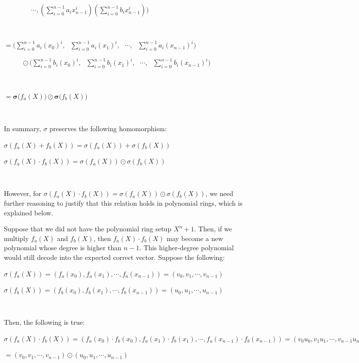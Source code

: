 $  \text{ } \text{ } \text{ } \text{ } \text{ } \text{ }
\cdots,
\left(\sum\limits_{i=0}^{n-1}a_ix_{n-1}^i\right)\left( \sum\limits_{i=0}^{n-1}b_ix_{n-1}^i\right)
\Bigg)$

$ $

$ = \Bigg(\sum\limits_{i=0}^{n-1}a_i(x_0)^i, \text{ } \sum\limits_{i=0}^{n-1}a_i(x_1)^i, \text{ } \cdots, \text{ } \sum\limits_{i=0}^{n-1}a_i(x_{n-1})^i\Bigg)$

$  \text{ } \text{ } \text{ } \text{ }  \odot  \Bigg(\sum\limits_{i=0}^{n-1}b_i(x_0)^i, \text{ } 
\sum\limits_{i=0}^{n-1}b_i(x_1)^i, \text{ }
\cdots, \text{ } \sum\limits_{i=0}^{n-1}b_i(x_{n-1})^i\Bigg)$

$ $

$= \bm{\sigma(}f_a(X)\bm{)} \odot \bm{\sigma(}f_b(X)\bm{)}$

$ $

In summary, $\sigma$ preserves the following homomorphism:

$\sigma(f_a(X) + f_b(X)) = \sigma(f_a(X)) + \sigma(f_b(X))$

$\sigma(f_a(X) \cdot f_b(X)) = \sigma(f_a(X)) \odot \sigma(f_b(X))$

$ $

However, for $\sigma(f_a(X) \cdot f_b(X)) = \sigma(f_a(X)) \odot \sigma(f_b(X))$, we need further reasoning to justify that this relation holds in polynomial rings, which is explained below.


 Suppose that we did not have the polynomial ring setup $X^n + 1$. Then, if we multiply $f_a(X)$ and $f_b(X)$, then $f_a(X) \cdot f_b(X)$ may become a new polynomial whose degree is higher than $n-1$. This higher-degree polynomial would still decode into the expected correct vector. Suppose the following:

$\sigma(f_a(X)) = (f_a(x_0), f_a(x_1), \cdots, f_a(x_{n-1})) = (v_0, v_1, \cdots, v_{n-1})$

$\sigma(f_b(X)) = (f_b(x_0), f_b(x_1), \cdots, f_b(x_{n-1})) = (u_0, u_1, \cdots, u_{n-1})$

$ $

Then, the following is true: 

$\sigma(f_a(X) \cdot f_b(X)) = (f_a(x_0)\cdot f_b(x_0), f_a(x_1)\cdot f_b(x_1), \cdots, f_a(x_{n-1})\cdot f_b(x_{n-1})) = (v_0u_0, v_1u_1, \cdots, v_{n-1}u_{n-1})$

$= (v_0, v_1, \cdots, v_{n-1}) \odot (u_0, u_1, \cdots, u_{n-1}) $

$ $

